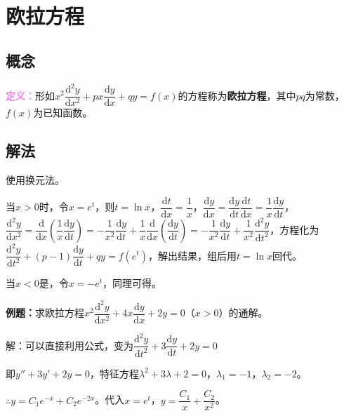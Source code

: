 \documentclass[UTF8, 12pt]{ctexart}
\begin{document}
\section{欧拉方程}

\subsection{概念}

\textcolor{violet}{\textbf{定义：}}形如$x^2\dfrac{\textrm{d}^2y}{\textrm{d}x^2}+px\dfrac{\textrm{d}y}{\textrm{d}x}+qy=f(x)$的方程称为\textbf{欧拉方程}，其中$pq$为常数，$f(x)$为已知函数。

\subsection{解法}

使用换元法。

当$x>0$时，令$x=e^t$，则$t=\ln x$，$\dfrac{\textrm{d}t}{\textrm{d}x}=\dfrac{1}{x}$，$\dfrac{\textrm{d}y}{\textrm{d}x}=\dfrac{\textrm{d}y}{\textrm{d}t}\dfrac{\textrm{d}t}{\textrm{d}x}=\dfrac{1}{x}\dfrac{\textrm{d}y}{\textrm{d}t}$，$\dfrac{\textrm{d}^2y}{\textrm{d}x^2}=\dfrac{\textrm{d}}{\textrm{d}x}\left(\dfrac{1}{x}\dfrac{\textrm{d}y}{\textrm{d}t}\right)=-\dfrac{1}{x^2}\dfrac{\textrm{d}y}{\textrm{d}t}+\dfrac{1}{x}\dfrac{\textrm{d}}{\textrm{d}x}\left(\dfrac{\textrm{d}y}{\textrm{d}t}\right)=-\dfrac{1}{x^2}\dfrac{\textrm{d}y}{\textrm{d}t}+\dfrac{1}{x^2}\dfrac{\textrm{d}^2y}{\textrm{d}t^2}$，方程化为$\dfrac{\textrm{d}^2y}{\textrm{d}t^2}+(p-1)\dfrac{\textrm{d}y}{\textrm{d}t}+qy=f(e^t)$，解出结果，组后用$t=\ln x$回代。

当$x<0$是，令$x=-e^t$，同理可得。

\textbf{例题：}求欧拉方程$x^2\dfrac{\textrm{d}^2y}{\textrm{d}x^2}+4x\dfrac{\textrm{d}y}{\textrm{d}x}+2y=0$（$x>0$）的通解。

解：可以直接利用公式，变为$\dfrac{\textrm{d}^2y}{\textrm{d}t^2}+3\dfrac{\textrm{d}y}{\textrm{d}t}+2y=0$

即$y''+3y'+2y=0$，特征方程$\lambda^2+3\lambda+2=0$，$\lambda_1=-1$，$\lambda_2=-2$。

$\therefore y=C_1e^{-x}+C_2e^{-2x}$。代入$x=e^t$，$y=\dfrac{C_1}{x}+\dfrac{C_2}{x^2}$。
\end{document}
